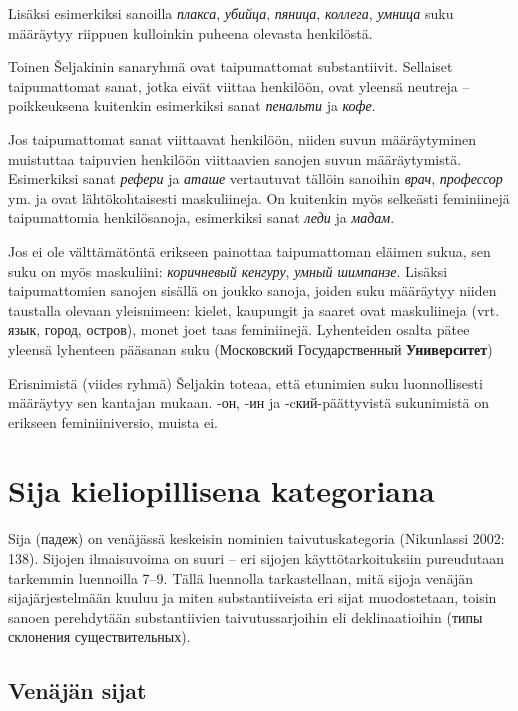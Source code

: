 \documentclass[]{scrreprt}
\begin{document}
Lisäksi esimerkiksi sanoilla \emph{плакса}, \emph{убийца},
\emph{пяница}, \emph{коллега}, \emph{умница} suku määräytyy riippuen
kulloinkin puheena olevasta henkilöstä.

Toinen Šeljakinin sanaryhmä ovat taipumattomat substantiivit. Sellaiset
taipumattomat sanat, jotka eivät viittaa henkilöön, ovat yleensä
neutreja -- poikkeuksena kuitenkin esimerkiksi sanat \emph{пенальти} ja
\emph{кофе}.

Jos taipumattomat sanat viittaavat henkilöön, niiden suvun määräytyminen
muistuttaa taipuvien henkilöön viittaavien sanojen suvun määräytymistä.
Esimerkiksi sanat \emph{рефери} ja \emph{аташе} vertautuvat tällöin
sanoihin \emph{врач}, \emph{профессор} ym. ja ovat lähtökohtaisesti
maskuliineja. On kuitenkin myös selkeästi feminiinejä taipumattomia
henkilösanoja, esimerkiksi sanat \emph{леди} ja \emph{мадам}.

Jos ei ole välttämätöntä erikseen painottaa taipumattoman eläimen sukua,
sen suku on myös maskuliini: \emph{коричневый кенгуру}, \emph{умный
шимпанзе}. Lisäksi taipumattomien sanojen sisällä on joukko sanoja,
joiden suku määräytyy niiden taustalla olevaan yleisnimeen: kielet,
kaupungit ja saaret ovat maskuliineja (vrt. язык, город, остров), monet
joet taas feminiinejä. Lyhenteiden osalta pätee yleensä lyhenteen
pääsanan suku (Московский Государственный \textbf{Университет})

Erisnimistä (viides ryhmä) Šeljakin toteaa, että etunimien suku
luonnollisesti määräytyy sen kantajan mukaan. -он, -ин ja
-cкий-päättyvistä sukunimistä on erikseen feminiiniversio, muista ei.

\chapter{Sija kieliopillisena
kategoriana}\label{luento-4-sija-kieliopillisena-kategoriana}


Sija (падеж) on venäjässä keskeisin nominien taivutuskategoria
(Nikunlassi 2002: 138). Sijojen ilmaisuvoima on suuri -- eri sijojen
käyttötarkoituksiin pureudutaan tarkemmin luennoilla 7--9. Tällä
luennolla tarkastellaan, mitä sijoja venäjän sijajärjestelmään kuuluu ja
miten substantiiveista eri sijat muodostetaan, toisin sanoen perehdytään
substantiivien taivutussarjoihin eli deklinaatioihin (типы склонения
существительных).

\section{Venäjän sijat}\label{venuxe4juxe4n-sijat}
\end{document}
